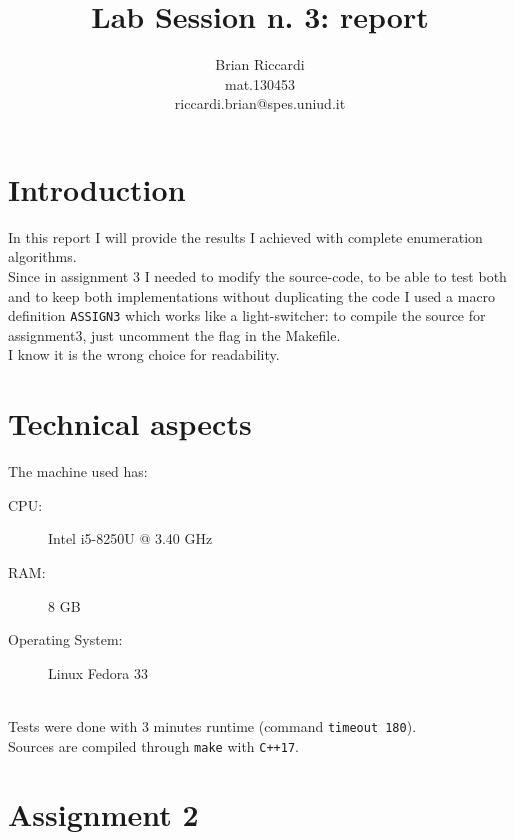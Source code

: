 \documentclass{article}
\title{Lab Session n. 3: report}
\author{Brian Riccardi \\ mat.130453 \\ riccardi.brian@spes.uniud.it}
\date{}
\begin{document}
\maketitle

\section{Introduction}
In this report I will provide the results I achieved with complete enumeration algorithms.\\
Since in assignment 3 I needed to modify the source-code, to be able to test both and to keep
both implementations without duplicating the code I used a macro definition \texttt{ASSIGN3} which
works like a light-switcher: to compile the source for assignment3, just uncomment the flag in the Makefile.\\
I know it is the wrong choice for readability.

\section{Technical aspects}
The machine used has:

\begin{description}
    \item[CPU:] Intel i5-8250U @ 3.40 GHz
    \item[RAM:] 8 GB
    \item[Operating System:] Linux Fedora 33
\end{description}
\ \\
Tests were done with 3 minutes runtime (command \texttt{timeout 180}).\\
Sources are compiled through \texttt{make} with \texttt{C++17}.

\section{Assignment 2}
\end{document}
